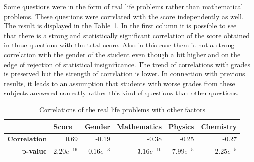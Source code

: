 Some questions were in the form of real life problems rather than mathematical problems. These questions were correlated with the score independently as well. The result is displayed in the Table~\ref{tab:corr2}. In the first column it is possible to see that there is a strong and statistically significant correlation of the score obtained in these questions with the total score. Also in this case there is not a strong correlation with the gender of the student even though a bit higher and on the edge of rejection of statistical insignificance. The trend of correlations with grades is preserved but the strength of correlation is lower. In connection with previous results, it leads to an assumption that students with worse grades from these subjects answered correctly rather this kind of questions than other questions.

\begin{table}[htbp]%
\caption{Correlations of the real life problems with other factors}
\label{tab:corr2}
\begin{center}
    \begin{tabular}{rrrrrr}
    \hline
    \multicolumn{1}{l}{\textbf{}} & \multicolumn{1}{l}{\textbf{Score}} & \multicolumn{1}{l}{\textbf{Gender}} & \multicolumn{1}{l}{\textbf{Mathematics}} & \multicolumn{1}{l}{\textbf{Physics}} & \multicolumn{1}{l}{\textbf{Chemistry}} \\
    \hline
    \textbf{Correlation}& 0.69  & -0.19  & -0.38  & -0.25  & -0.27  \\
		\textbf{p-value}& $2.20e^{-16}$   & $0.16e^{-3}$  & $3.16e^{-10}$  & $7.99e^{-5}$   & $2.25e^{-5}$   \\
    \hline
    \end{tabular}%
\end{center}
\end{table}
